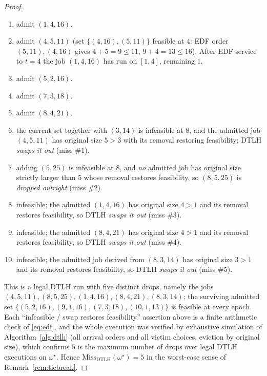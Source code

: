 \documentclass{amsart}
\theoremstyle{definition}
\begin{document}
\begin{proof}
\begin{enumerate}
\item[$t=1$:] admit $(1,4,16)$. \quad
\item[$t=4$:] admit $(4,5,11)$ (set $\{(4,16),(5,11)\}$ feasible at $4$:
EDF order $(5,11),(4,16)$ gives $4+5=9\le11$, $9+4=13\le16$). After EDF service to
$t=4$ the job $(1,4,16)$ has run on $[1,4]$, remaining $1$.
\item[$t=5$:] admit $(5,2,16)$.
\item[$t=7$:] admit $(7,3,18)$.
\item[$t=8$:] admit $(8,4,21)$.
\item[$t=8$, arrival $(8,3,14)$:] the current set together with $(3,14)$ is
infeasible at $8$, and the admitted job $(4,5,11)$ has original size $5>3$ with
its removal restoring feasibility; DTLH \emph{swaps it out} (miss \#1).
\item[$t=8$, arrival $(8,5,25)$:] adding $(5,25)$ is infeasible at $8$, and
\emph{no} admitted job has original size strictly larger than $5$ whose removal
restores feasibility, so $(8,5,25)$ is \emph{dropped outright} (miss \#2).
\item[$t=9$, arrival $(9,1,16)$:] infeasible; the admitted $(1,4,16)$ has
original size $4>1$ and its removal restores feasibility, so DTLH \emph{swaps it
out} (miss \#3).
\item[$t=9$, arrival $(9,1,13)$:] infeasible; the admitted $(8,4,21)$ has
original size $4>1$ and its removal restores feasibility, so DTLH \emph{swaps it
out} (miss \#4).
\item[$t=10$, arrival $(10,1,13)$:] infeasible; the admitted job derived from
$(8,3,14)$ has original size $3>1$ and its removal restores feasibility, so DTLH
\emph{swaps it out} (miss \#5).
\end{enumerate}
This is a legal DTLH run with five distinct drops, namely the jobs
$(4,5,11),(8,5,25),(1,4,16),(8,4,21),(8,3,14)$; the surviving admitted set
$\{(5,2,16),(9,1,16),(7,3,18),(10,1,13)\}$ is feasible at every epoch.
Each ``infeasible / swap restores feasibility'' assertion above is a finite
arithmetic check of \eqref{eq:edf}, and the whole execution was verified by
exhaustive simulation of Algorithm~\ref{alg:dtlh} (all arrival orders and all
victim choices, eviction by original size), which confirms $5$ is the maximum
number of drops over legal DTLH executions on $\omega^\star$. Hence
$\mathrm{Miss}_{\mathrm{DTLH}}(\omega^\star)=5$ in the worst-case sense of
Remark~\ref{rem:tiebreak}.
\end{proof}
\end{document}
